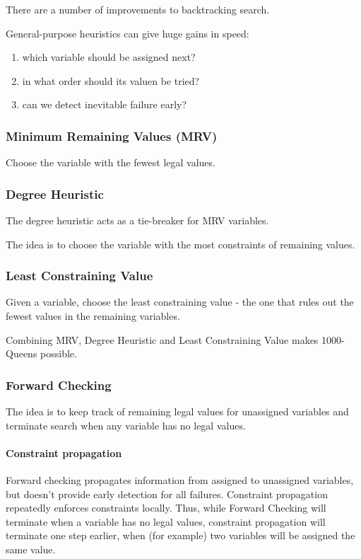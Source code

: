 There are a number of improvements to backtracking search.

General-purpose heuristics can give huge gains in speed:
\begin{enumerate}
    \item which variable should be assigned next?
    \item in what order should its valuen be tried?
    \item can we detect inevitable failure early?
\end{enumerate}

\subsubsection{Minimum Remaining Values (MRV)}
Choose the variable with the fewest legal values.

\subsubsection{Degree Heuristic}
The degree heuristic acts as a tie-breaker for MRV variables.

The idea is to choose the variable with the most constraints of remaining
values.

\subsubsection{Least Constraining Value}
Given a variable, choose the least constraining value - the one that rules out
the fewest values in the remaining variables.

Combining MRV, Degree Heuristic and Least Constraining Value makes 1000-Queens
possible.

\subsubsection{Forward Checking}
The idea is to keep track of remaining legal values for unassigned variables
and terminate search when any variable has no legal values.

\paragraph{Constraint propagation}
Forward checking propagates information from assigned to unassigned variables,
but doesn't provide early detection for all failures. Constraint propagation
repeatedly enforces constraints locally. Thus, while Forward Checking will
terminate when a variable has no legal values, constraint propagation will
terminate one step earlier, when (for example) two variables will be assigned
the same value.

